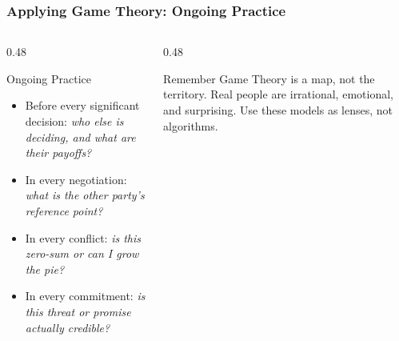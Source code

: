 \begin{frame}[fragile]\frametitle{Applying Game Theory: Ongoing Practice}
  \begin{columns}
    \begin{column}[T]{0.48\linewidth}
      \begin{block}{Ongoing Practice}
        \begin{itemize}
          \item Before every significant decision: \textit{who else is deciding, and what are their payoffs?}
          \item In every negotiation: \textit{what is the other party's reference point?}
          \item In every conflict: \textit{is this zero-sum or can I grow the pie?}
          \item In every commitment: \textit{is this threat or promise actually credible?}
        \end{itemize}
      \end{block}
    \end{column}
    \begin{column}[T]{0.48\linewidth}

      \begin{alertblock}{Remember}
        Game Theory is a map, not the territory. Real people are irrational, emotional, and surprising. Use these models as lenses, not algorithms.
      \end{alertblock}
    \end{column}
  \end{columns}
\end{frame}

